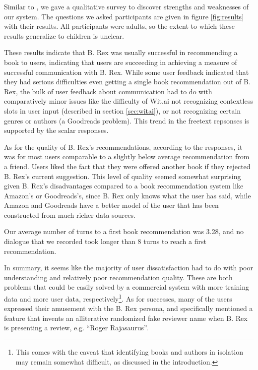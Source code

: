 \documentclass[11pt,a4paper]{article}
\begin{document}
Similar to \citeauthor{Griol:13} , we gave a qualitative survey to discover strengths and weaknesses of our system. The questions we asked participants are given in figure \ref{fig:results} with their results. All participants were adults, so the extent to which these results generalize to children is unclear.

These results indicate that B. Rex was usually successful in recommending a book to users, indicating that users are succeeding in achieving a measure of successful communication with B. Rex. While some user feedback indicated that they had serious difficulties even getting a single book recommendation out of B. Rex, the bulk of user feedback about communication had to do with comparatively minor issues like the difficulty of Wit.ai not recognizing contextless slots in user input (described in section \ref{sec:witai}), or not recognizing certain genres or authors (a Goodreads problem). This trend in the freetext repsonses is supported by the scalar responses.

As for the quality of B. Rex's recommendations, according to the responses, it was for most users comparable to a slightly below average recommendation from a friend. Users liked the fact that they were offered another book if they rejected B. Rex's current suggestion. This level of quality seemed somewhat surprising given B. Rex's disadvantages compared to a book recommendation system like Amazon's or Goodreads's, since B. Rex only knows what the user has said, while Amazon and Goodreads have a better model of the user that has been constructed from much richer data sources. 

Our average number of turns to a first book recommendation was 3.28, and no dialogue that we recorded took longer than 8 turns to reach a first recommendation. 

In summary, it seems like the majority of user dissatisfaction had to do with poor understanding and relatively poor recommendation quality. These are both problems that could be easily solved by a commercial system with more training data and more user data, respectively\footnote{This comes with the caveat that identifying books and authors in isolation may remain somewhat difficult, as discussed in the introduction.}. As for successes, many of the users expressed their amusement with the B. Rex persona, and specifically mentioned a feature that invents an alliterative randomized fake reviewer name when B. Rex is presenting a review, e.g. ``Roger Rajasaurus''.
\end{document}
